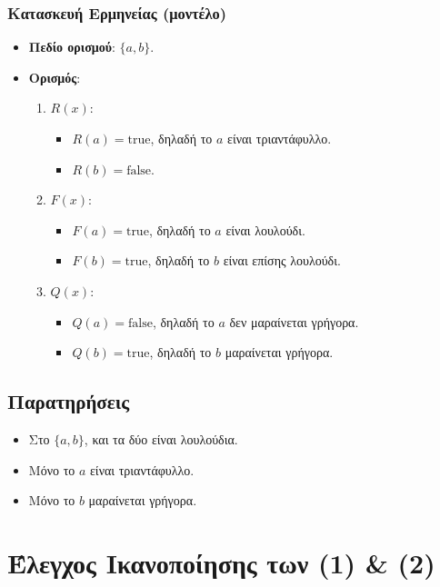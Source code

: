 \documentclass[a4paper,12pt]{article}
\begin{document}
\subsubsection*{Κατασκευή Ερμηνείας (μοντέλο)}
\begin{itemize}
    \item \textbf{Πεδίο ορισμού}: \(\{a, b\}\).
    \item \textbf{Ορισμός}:
    \begin{enumerate}
        \item \(R(x)\):
        \begin{itemize}
            \item \(R(a) = \text{true}\), δηλαδή το \(a\) είναι τριαντάφυλλο.
            \item \(R(b) = \text{false}\).
        \end{itemize}
        \item \(F(x)\):
        \begin{itemize}
            \item \(F(a) = \text{true}\), δηλαδή το \(a\) είναι λουλούδι.
            \item \(F(b) = \text{true}\), δηλαδή το \(b\) είναι επίσης λουλούδι.
        \end{itemize}
        \item \(Q(x)\):
        \begin{itemize}
            \item \(Q(a) = \text{false}\), δηλαδή το \(a\) δεν μαραίνεται γρήγορα.
            \item \(Q(b) = \text{true}\), δηλαδή το \(b\) μαραίνεται γρήγορα.
        \end{itemize}
    \end{enumerate}
\end{itemize}

\subsection*{Παρατηρήσεις}
\begin{itemize}
    \item Στο \(\{a, b\}\), και τα δύο είναι λουλούδια.
    \item Μόνο το \(a\) είναι τριαντάφυλλο.
    \item Μόνο το \(b\) μαραίνεται γρήγορα.
\end{itemize}

\section*{Έλεγχος Ικανοποίησης των (1) \& (2)}
\end{document}
